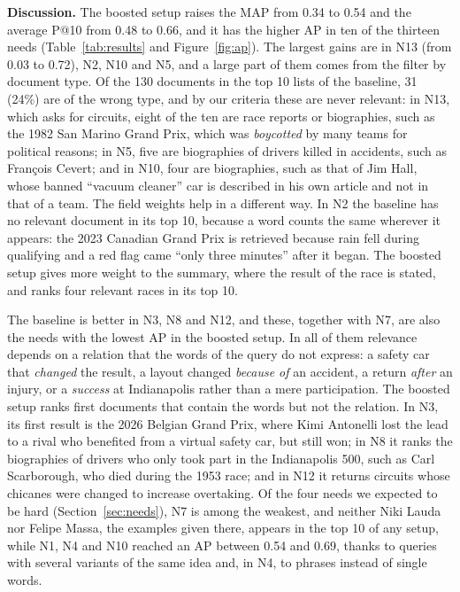 \documentclass[sigconf]{acmart}
\begin{document}
\textbf{Discussion.} The boosted setup raises the MAP from 0.34 to 0.54 and
the average P@10 from 0.48 to 0.66, and it has the higher AP in ten of the
thirteen needs (Table~\ref{tab:results} and Figure~\ref{fig:ap}). The
largest gains are in N13 (from
0.03 to 0.72), N2, N10 and N5, and a large part of them comes from the filter
by document type. Of the 130 documents in the top 10 lists of the baseline,
31 (24\%) are of the wrong type, and by our criteria these are never
relevant: in N13, which asks for circuits, eight of the ten are race reports
or biographies, such as the 1982 San Marino Grand Prix, which was
\emph{boycotted} by many teams for political reasons; in N5, five are
biographies of drivers killed in accidents, such as François Cevert; and in
N10, four are biographies, such as that of Jim Hall, whose banned
``vacuum cleaner'' car is described in his own article and not in that of a
team. The field weights help in a different way. In N2 the baseline has no
relevant document in its top 10, because a word counts the same wherever it
appears: the 2023 Canadian Grand Prix is retrieved because rain fell during
qualifying and a red flag came ``only three minutes'' after it began. The
boosted setup gives more weight to the summary, where the result of the race
is stated, and ranks four relevant races in its top 10.

The baseline is better in N3, N8 and N12, and these, together with N7, are
also the needs with the lowest AP in the boosted setup. In all of them
relevance depends on a relation that the words of the query do not express:
a safety car that \emph{changed} the result, a layout changed \emph{because
of} an accident, a return \emph{after} an injury, or a \emph{success} at
Indianapolis rather than a mere participation. The boosted setup ranks first
documents that contain the words but not the relation. In N3, its first result
is the 2026 Belgian Grand Prix, where Kimi Antonelli lost the lead to a rival
who benefited from a virtual safety car, but still won; in N8 it ranks the biographies of
drivers who only took part in the Indianapolis 500, such as Carl Scarborough,
who died during the 1953 race; and in N12 it returns circuits whose chicanes
were changed to increase overtaking. Of the
four needs we expected to be hard (Section~\ref{sec:needs}), N7 is among the
weakest, and neither Niki Lauda nor Felipe Massa, the examples given there,
appears in the top 10 of any setup, while N1, N4 and N10 reached an AP between 0.54 and 0.69, thanks to
queries with several variants of the same idea and, in N4, to phrases instead
of single words.
\end{document}
